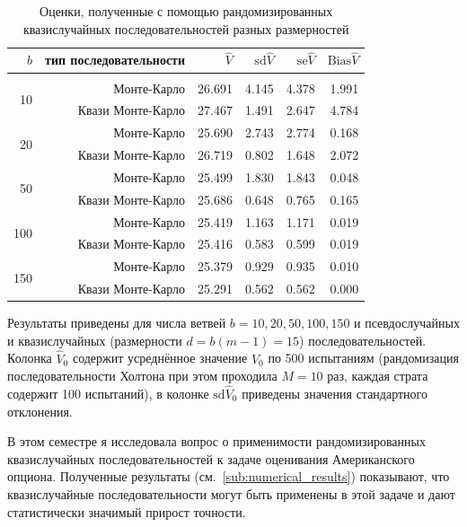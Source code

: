 \documentclass[specialist,
               substylefile = ../spbu.rtx,
               subf,href,colorlinks=true, 12pt]{disser}
\newcommand{\Vhat}{\hat{V}}
\begin{document}
\begin{table}
	\renewcommand{\arraystretch}{0.6}
	\centering
	\caption{Оценки, полученные с помощью рандомизированных квазислучайных последовательностей разных размерностей}
	\begin{tabular}{rrrrrr}
		$b$&тип последовательности&$\Vhat$&$\mathrm{sd}\Vhat$&$\mathrm{se}\Vhat$&$\mathrm{Bias}\Vhat$\\[5pt]\hline\\[-8pt]

		\multirow{2}{*}{10}&Монте-Карло&26.691&4.145&4.378&1.991\\
		&Квази Монте-Карло&27.467&1.491&2.647&4.784\\[5pt]
		\multirow{2}{*}{20}&Монте-Карло&25.690&2.743&2.774&0.168\\
		&Квази Монте-Карло&26.719&0.802&1.648&2.072\\[5pt]
		\multirow{2}{*}{50}&Монте-Карло&25.499&1.830&1.843&0.048\\
		&Квази Монте-Карло&25.686&0.648&0.765&0.165\\[5pt]
		\multirow{2}{*}{100}&Монте-Карло&25.419&1.163&1.171&0.019\\
		&Квази Монте-Карло&25.416&0.583&0.599&0.019\\[5pt]
		\multirow{2}{*}{150}&Монте-Карло&25.379&0.929&0.935&0.010\\
		&Квази Монте-Карло&25.291&0.562&0.562&0.000\\[10pt]
	\end{tabular}
	\label{tbl:quasi_vs_common_mc}

	\footnotesize
	Результаты приведены для числа ветвей $b = 10, 20, 50, 100, 150$ и псевдослучайных и квазислучайных (размерности $d = b(m-1) = 15$) последовательностей. Колонка $\Vhat_0$ содержит усреднённое значение $\Vhat_0$ по 500 испытаниям (рандомизация последовательности Холтона при этом проходила $M = 10$ раз, каждая страта содержит 100 испытаний), в колонке $\mathrm{sd}\Vhat_0$ приведены значения стандартного отклонения.
\end{table}




\conclusion

В этом семестре я исследовала вопрос о применимости рандомизированных квазислучайных последовательностей к задаче оценивания Американского опциона. Полученные результаты (см.~\ref{sub:numerical_results}) показывают, что квазислучайные последовательности могут быть применены в этой задаче и дают статистически значимый прирост точности. 
\end{document}
